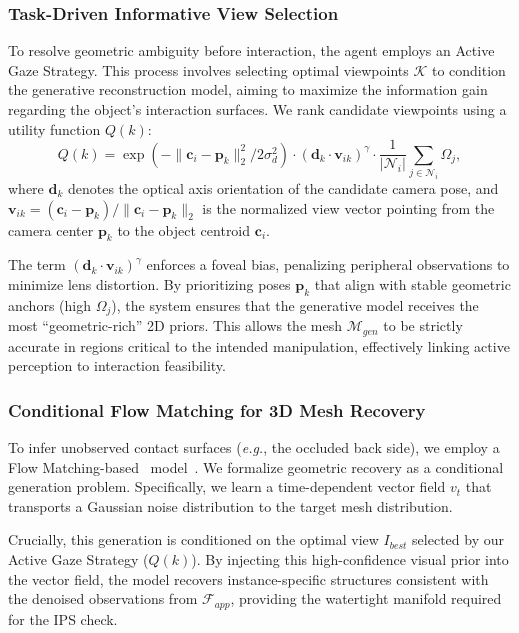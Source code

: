 \documentclass[conference]{IEEEtran}
\begin{document}
\subsubsection{Task-Driven Informative View Selection}
To resolve geometric ambiguity before interaction, the agent employs an Active Gaze Strategy. This process involves selecting optimal viewpoints $\mathcal{K}$ to condition the generative reconstruction model, aiming to maximize the information gain regarding the object's interaction surfaces. We rank candidate viewpoints using a utility function $Q(k)$:
\begin{equation}
    Q(k) = \exp( -\| \mathbf{c}_i - \mathbf{p}_k \|_2^2 / 2\sigma_d^2 ) \cdot (\mathbf{d}_k \cdot \mathbf{v}_{ik})^\gamma \cdot \frac{1}{|\mathcal{N}_i|} \sum_{j \in \mathcal{N}_i} \Omega_j, \label{eq:qk}
\end{equation}
where $\mathbf{d}_k$ denotes the optical axis orientation of the candidate camera pose, and $\mathbf{v}_{ik} = (\mathbf{c}_i - \mathbf{p}_k) / \|\mathbf{c}_i - \mathbf{p}_k\|_2$ is the normalized view vector pointing from the camera center $\mathbf{p}_k$ to the object centroid $\mathbf{c}_i$.

The term $(\mathbf{d}_k \cdot \mathbf{v}_{ik})^\gamma$ enforces a foveal bias, penalizing peripheral observations to minimize lens distortion. By prioritizing poses $\mathbf{p}_k$ that align with stable geometric anchors (high $\Omega_j$), the system ensures that the generative model receives the most ``geometric-rich'' 2D priors. This allows the mesh $\mathcal{M}_{gen}$ to be strictly accurate in regions critical to the intended manipulation, effectively linking active perception to interaction feasibility.

\subsubsection{Conditional Flow Matching for 3D Mesh Recovery}
To infer unobserved contact surfaces (\emph{e.g.}, the occluded back side), we employ a Flow Matching-based~\cite{lipman2022flow} model~\cite{chen2025sam}. We formalize geometric recovery as a conditional generation problem. Specifically, we learn a time-dependent vector field $v_t$ that transports a Gaussian noise distribution to the target mesh distribution. 

Crucially, this generation is conditioned on the optimal view $I_{best}$ selected by our Active Gaze Strategy ($Q(k)$). By injecting this high-confidence visual prior into the vector field, the model recovers instance-specific structures consistent with the denoised observations from $\mathcal{F}_{app}$, providing the watertight manifold required for the IPS check.
\end{document}
